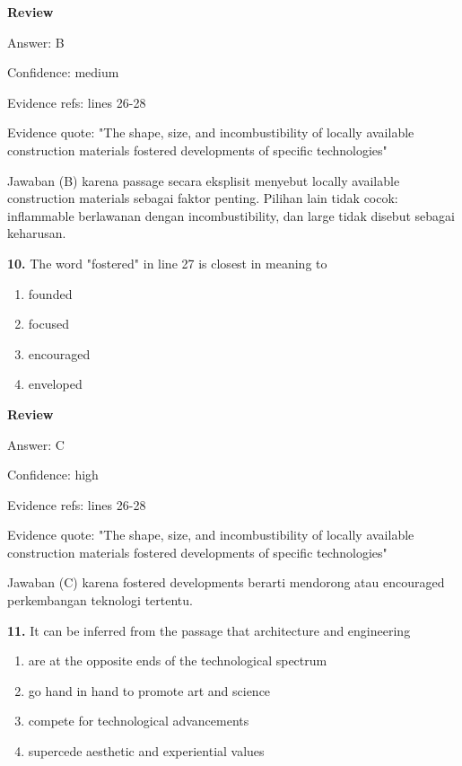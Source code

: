 \documentclass[12pt]{article}
\begin{document}
\par
\begingroup
\setlength{\parskip}{0pt}
\setlength{\parindent}{0pt}
\textbf{Review}\par
Answer: B\par
Confidence: medium\par
Evidence refs: lines 26-28\par
Evidence quote: "The shape, size, and incombustibility of locally available construction materials fostered developments of specific technologies"\par
Jawaban (B) karena passage secara eksplisit menyebut locally available construction materials sebagai faktor penting. Pilihan lain tidak cocok: inflammable berlawanan dengan incombustibility, dan large tidak disebut sebagai keharusan.\par
\endgroup
\par
\vspace{0.25\baselineskip}
\noindent\textbf{10.} The word "fostered" in line 27 is closest in meaning to
\begin{enumerate}[label=(\Alph*),leftmargin=*,itemsep=0.2em]
\item founded
\item focused
\item encouraged
\item enveloped
\end{enumerate}
\par
\begingroup
\setlength{\parskip}{0pt}
\setlength{\parindent}{0pt}
\textbf{Review}\par
Answer: C\par
Confidence: high\par
Evidence refs: lines 26-28\par
Evidence quote: "The shape, size, and incombustibility of locally available construction materials fostered developments of specific technologies"\par
Jawaban (C) karena fostered developments berarti mendorong atau encouraged perkembangan teknologi tertentu.\par
\endgroup
\par
\vspace{0.25\baselineskip}
\noindent\textbf{11.} It can be inferred from the passage that architecture and engineering
\begin{enumerate}[label=(\Alph*),leftmargin=*,itemsep=0.2em]
\item are at the opposite ends of the technological spectrum
\item go hand in hand to promote art and science
\item compete for technological advancements
\item supercede aesthetic and experiential values
\end{enumerate}
\end{document}
